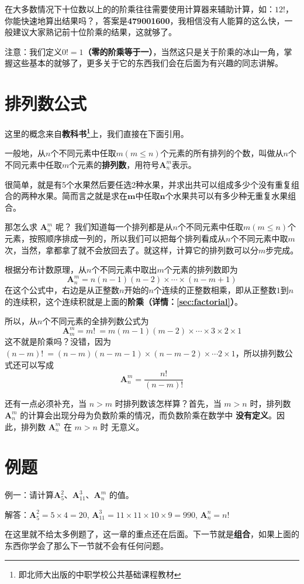 在大多数情况下十位数以上的的阶乘往往需要使用计算器来辅助计算，如：$12!$，你能快速地算出结果吗？，答案是\textbf{479001600}，我相信没有人能算的这么快，一般建议大家熟记前十位阶乘的结果，这就够了。

{\color{red} 注意：}我们定义\textbf{$0! = 1$（零的阶乘等于一）}，当然这只是关于阶乘的冰山一角，掌握这些基本的就够了，更多关于它的东西我们会在后面为有兴趣的同志讲解。

\section{排列数公式}
这里的概念来自\textbf{教科书\footnote{即北师大出版的中职学校公共基础课程教材}}上，我们直接在下面引用。

一般地，从$\mathit{n}$个不同元素中任取$m(m \le n)$个元素的所有排列的个数，叫做从$\mathit{n}$个不同元素中任取$\mathit{m}$个元素的\textbf{排列数}，用符号$\textbf{A}_{n}^{m}$表示。

很简单，就是有5个水果然后要任选2种水果，并求出共可以组成多少个没有重复组合的两种水果。简而言之就是求在$\textbf{m}$中任取$\textbf{n}$个水果共可以有多少种无重复水果组合。

那怎么求 $\textbf{A}_{n}^{m}$ 呢？ 我们知道每一个排列都是从$n$个不同元素中任取$m(m \le n)$个元素，按照顺序排成一列的，所以我们可以把每个排列看成从$n$个不同元素中取$m$次，当然，拿都拿了就不会放回去了。就这样，计算它的排列数可以分$m$步完成。

根据分布计数原理，从$n$个不同元素中取出$m$个元素的排列数即为
\begin{equation}
    \textbf{A}_{n}^{m} = n(n-1)(n-2) \times \cdots{} \times (n-m+1)
\end{equation}
在这个公式中，右边是从正整数$n$开始的$n$个连续的正整数相乘，即从正整数$1$到$n$的连续积，这个连续积就是上面的\textbf{阶乘（详情：\ref{sec:factorial}）}。 

所以，从$n$个不同元素的全排列数公式为
\begin{equation*}
    \textbf{A}_{m}^{m}=m!~=m(m-1)(m-2)\times \cdots{}\times 3 \times 2 \times 1
\end{equation*}
这不就是阶乘吗？没错，因为$(n-m)!~=(n-m)(n-m-1)\times (n-m-2) \times \cdots{} 2 \times 1$，所以排列数公式还可以写成
\begin{equation}
    \textbf{A}_{n}^{m}=\frac{n!}{(n-m)!}
\end{equation}

还有一点必须补充，当 $n > m$ 时排列数该怎样算？首先，当 $m>n$ 时，排列数 $\textbf{A}_{n}^m$ 的计算会出现分母为负数阶乘的情况，而负数阶乘在数学中 \textbf{没有定义}。因此，排列数 $\textbf{A}_{n}^m$ 在 $m>n$ 时 无意义。

\section{例题}
{\color{blue} 例一：}{请计算$\textbf{A}_{5}^{2}$}、$\textbf{A}_{11}^{3}$、$\textbf{A}_{n}^{m}$ 的值。

{\color{blue} 解答：}$\textbf{A}_{5}^{2} = 5 \times 4 = 20$, $\textbf{A}_{11}^{3}=11 \times 11 \times 10 \times 9 = 990$, $\textbf{A}_{n}^{n} = n!$

在这里就不给太多例题了，这一章的重点还在后面。下一节就是\textbf{组合}，如果上面的东西你学会了那么下一节就不会有任何问题。

